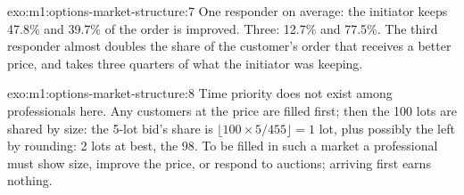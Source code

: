 \begin{solution}{exo:m1:options-market-structure:7}
One responder on average: the initiator keeps 47.8\% and 39.7\% of the order
is improved. Three: 12.7\% and 77.5\%. The third responder almost doubles the
share of the customer's order that receives a better price, and takes three
quarters of what the initiator was keeping.
\end{solution}

\begin{solution}{exo:m1:options-market-structure:8}
Time priority does not exist among professionals here. Any customers at the
price are filled first; then the 100 lots are shared by size: the 5-lot bid's
share is $\lfloor 100 \times 5/455\rfloor = 1$ lot, plus possibly the 
left by rounding: 2 lots at best, the  98. To be filled in such
a market a professional must show size, improve the price, or respond to
auctions; arriving first earns nothing.
\end{solution}

